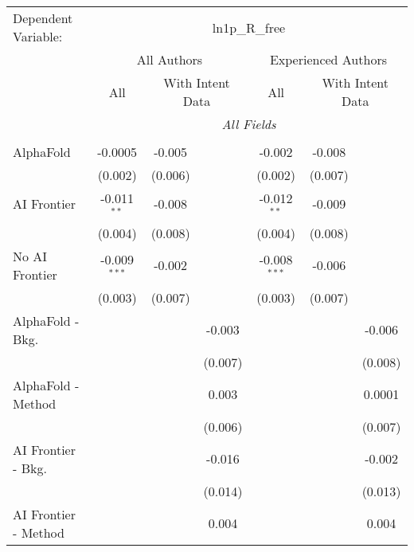\begingroup
\centering
\begin{tabular}{lcccccc}
   \tabularnewline \midrule \midrule
   Dependent Variable: & \multicolumn{6}{c}{ln1p\_R\_free}\\
 & \multicolumn{3}{c}{All Authors} & \multicolumn{3}{c}{Experienced Authors} \\
\cmidrule(lr){2-4} \cmidrule(lr){5-7}
 & \multicolumn{1}{c}{All} & \multicolumn{2}{c}{With Intent Data} & \multicolumn{1}{c}{All} & \multicolumn{2}{c}{With Intent Data} \\
\cmidrule(lr){2-2} \cmidrule(lr){3-4} \cmidrule(lr){5-5} \cmidrule(lr){6-7}
 & \multicolumn{6}{c}{\textit{All Fields}} \\ \\
   AlphaFold               & -0.0005        & -0.005  &         & -0.002         & -0.008  &   \\   
                           & (0.002)        & (0.006) &         & (0.002)        & (0.007) &   \\   
   AI Frontier             & -0.011$^{**}$  & -0.008  &         & -0.012$^{**}$  & -0.009  &   \\   
                           & (0.004)        & (0.008) &         & (0.004)        & (0.008) &   \\   
   No AI Frontier          & -0.009$^{***}$ & -0.002  &         & -0.008$^{***}$ & -0.006  &   \\   
                           & (0.003)        & (0.007) &         & (0.003)        & (0.007) &   \\   
   AlphaFold - Bkg.        &                &         & -0.003  &                &         & -0.006\\   
                           &                &         & (0.007) &                &         & (0.008)\\   
   AlphaFold - Method      &                &         & 0.003   &                &         & 0.0001\\   
                           &                &         & (0.006) &                &         & (0.007)\\   
   AI Frontier - Bkg.      &                &         & -0.016  &                &         & -0.002\\   
                           &                &         & (0.014) &                &         & (0.013)\\   
   AI Frontier - Method    &                &         & 0.004   &                &         & 0.004\\   

\end{tabular}
